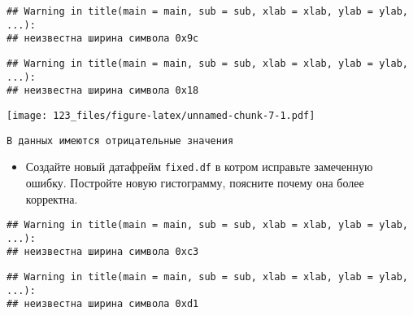 \documentclass[]{article}
\newenvironment{Shaded}{\begin{snugshade}}{\end{snugshade}}
\newcommand{\KeywordTok}[1]{\textcolor[rgb]{0.13,0.29,0.53}{\textbf{#1}}}
\newcommand{\DataTypeTok}[1]{\textcolor[rgb]{0.13,0.29,0.53}{#1}}
\newcommand{\DecValTok}[1]{\textcolor[rgb]{0.00,0.00,0.81}{#1}}
\newcommand{\StringTok}[1]{\textcolor[rgb]{0.31,0.60,0.02}{#1}}
\newcommand{\OperatorTok}[1]{\textcolor[rgb]{0.81,0.36,0.00}{\textbf{#1}}}
\newcommand{\NormalTok}[1]{#1}
\providecommand{\tightlist}{%
  \setlength{\itemsep}{0pt}\setlength{\parskip}{0pt}}
\begin{document}
\begin{verbatim}
## Warning in title(main = main, sub = sub, xlab = xlab, ylab = ylab, ...):
## неизвестна ширина символа 0x9c
\end{verbatim}

\begin{verbatim}
## Warning in title(main = main, sub = sub, xlab = xlab, ylab = ylab, ...):
## неизвестна ширина символа 0x18
\end{verbatim}

\texttt{[image: 123\_files/figure-latex/unnamed-chunk-7-1.pdf]}

\begin{verbatim}
В данных имеются отрицательные значения
\end{verbatim}

\begin{itemize}
\tightlist
\item
  Создайте новый датафрейм \texttt{fixed.df} в котром исправьте
  замеченную ошибку. Постройте новую гистограмму, поясните почему она
  более корректна.
\end{itemize}

\begin{Shaded}
\end{Shaded}

\begin{verbatim}
## Warning in title(main = main, sub = sub, xlab = xlab, ylab = ylab, ...):
## неизвестна ширина символа 0xc3
\end{verbatim}

\begin{verbatim}
## Warning in title(main = main, sub = sub, xlab = xlab, ylab = ylab, ...):
## неизвестна ширина символа 0xd1
\end{verbatim}
\end{document}

